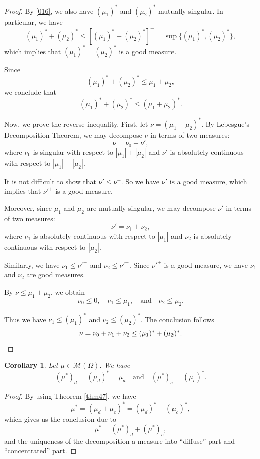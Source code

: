 \documentclass[a4paper, 11pt]{report}
\newtheorem{crr}{Corollary}[chapter]
\theoremstyle{definition}\newtheorem*{rmk}{Remark}
\begin{document}
\begin{proof}
\mbox{}

By \eqref{016}, we also have $(\mu_1)^*$ and $(\mu_2)^*$ mutually singular. In particular, we have
\[
(\mu_1)^* + (\mu_2)^* \leq [(\mu_1)^* + (\mu_2)^*]^+ = \sup \{(\mu_1)^* , (\mu_2)^*\},
\]
which implies that $(\mu_1)^* + (\mu_2)^*$ is a good measure.

Since
\[
(\mu_1)^* + (\mu_2)^* \leq \mu_1 + \mu_2,
\]
we conclude that
\[
(\mu_1)^* + (\mu_2)^* \leq (\mu_1 + \mu_2)^*.
\]

Now, we prove the reverse inequality. First, let $\nu = (\mu_1 + \mu_2)^*$. By Lebesgue's Decomposition Theorem, we may decompose $\nu$ in terms of two measures:
\[
\nu = \nu_0 + \nu',
\]
where $\nu_0$ is singular with respect to $|\mu_1| + |\mu_2|$ and $\nu'$ is absolutely continuous with respect to $|\mu_1| + |\mu_2|$.

It is not difficult to show that $\nu' \leq \nu^+$. So we have $\nu'$ is a good measure, which implies that $\nu'^+$ is a good measure.

Moreover, since $\mu_1$ and $\mu_2$ are mutually singular, we may decompose $\nu'$ in terms of two measures:
\[
\nu' = \nu_1 + \nu_2,
\]
where $\nu_1$ is absolutely continuous with respect to $|\mu_1|$ and $\nu_2$ is absolutely continuous with respect to $|\mu_2|$.

Similarly, we have $\nu_1 \leq \nu'^+$ and $\nu_2 \leq \nu'^+$. Since $\nu'^+$ is a good measure, we have $\nu_1$ and $\nu_2$ are good measures.

By $\nu \leq \mu_1 + \mu_2$, we obtain
\[
\nu_0 \leq 0,\quad \nu_1 \leq \mu_1, \quad\text{and}\quad \nu_2 \leq \mu_2.
\]

Thus we have $\nu_1 \leq (\mu_1)^*$ and $\nu_2 \leq (\mu_2)^*$. The conclusion follows
\[
\nu = \nu_0 + \nu_1 + \nu_2 \leq (\mu_1)^* + (\mu_2)^*.\qedhere
\]
\end{proof}

\begin{crr}\label{crr410}
Let $\mu \in \mathcal{M}(\Omega)$. We have
\[
(\mu^*)_d = (\mu_d)^* = \mu_d \quad \text{and}\quad (\mu^*)_c = (\mu_c)^*.
\]
\end{crr}

\begin{proof}
By using Theorem \ref{thm47}, we have
\[
\mu^* = (\mu_d + \mu_c)^* = (\mu_d)^* + (\mu_c)^*,
\]
which gives us the conclusion due to
\[
\mu^* = (\mu^*)_d + (\mu^*)_c,
\]
and the uniqueness of the decomposition a measure into ``diffuse'' part and ``concentrated'' part.
\end{proof}
\end{document}
